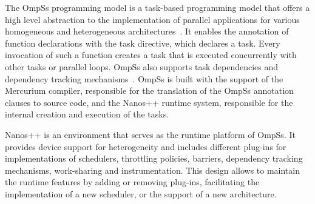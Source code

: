 The OmpSs programming model is a task-based programming model that offers a high level abstraction to the implementation of parallel applications for various homogeneous and heterogeneous architectures~\cite{OmpSs_PPL11,OmpSs}. It enables the annotation of function declarations with the task directive, which declares a task. Every invocation of such a function creates a task that is executed concurrently with other tasks or parallel loops. OmpSs also supports task dependencies and dependency tracking mechanisms~\cite{StarSs}. OmpSs is built with the support of the Mercurium compiler, responsible for the translation of the OmpSs annotation clauses to source code, and the Nanos++ runtime system, responsible for the internal creation and execution of the tasks.


Nanos++ is an environment that serves as the runtime platform of OmpSs. It provides device support for heterogeneity and includes different plug-ins for implementations of schedulers, throttling policies, barriers, dependency tracking mechanisms, work-sharing and instrumentation. This design allows to maintain the runtime features by adding or removing plug-ins, facilitating the implementation of a new scheduler, or the support of a new architecture.

